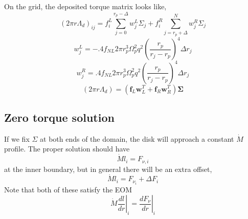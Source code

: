 \documentclass{article}
\begin{document}
On the grid, the deposited torque matrix looks like,
\begin{equation}
(2 \pi r \Lambda_d)_{ij} = f_i^L \sum_{j=0}^{r_p-\Delta } w_j^L \Sigma_j + f_i^R \sum_{j=r_p+\Delta}^N w_j^R \Sigma_j
\end{equation}
\begin{equation}
w_j^L = -.4 f_{NL} 2 \pi r_p^3 \Omega_p^2 q^2  \left( \frac{r_p}{r_j - r_p} \right)^4 \Delta r_j
\end{equation}
\begin{equation}
w_j^R=  .4 f_{NL} 2 \pi r_p^3 \Omega_p^2 q^2  \left( \frac{r_p}{r_j - r_p} \right)^4 \Delta r_j
\end{equation}
\begin{equation}
(2 \pi r \Lambda_d) = (\mathbf{f}_L \mathbf{w}_L^T + \mathbf{f}_R \mathbf{w}_R^T ) \mathbf{\Sigma}
\end{equation}



\subsection{Zero torque solution}

If we fix $\Sigma$ at both ends of the domain, the disk will approach a constant $\dot{M}$ profile. The proper solution should have 
\begin{equation}
\dot{M} l_i = F_{\nu,i}
\end{equation}
at the inner boundary, but in general there will be an extra offset,
\begin{equation}
\dot{M} l_i = F_{\nu_i}  + \Delta F_i
\end{equation}
Note that both of these satisfy the EOM
\begin{equation}
\left. \dot{M} \frac{d l}{d r} \right|_i = \left. \frac{d F_\nu}{d r} \right|_i
\end{equation}
\end{document}
